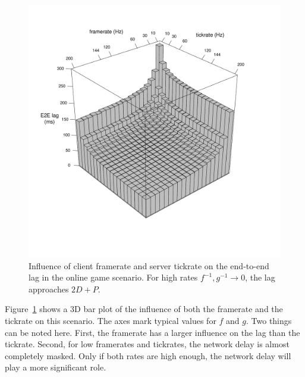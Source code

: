 \begin{figure}[!t]
	\centering
	\vspace{-6mm}
	\includegraphics[width=1.0\columnwidth]{../simulation/visualization/e2e-lag-3dbars.pdf}
	\vspace{-15mm}
	\caption{Influence of client framerate and server tickrate on the end-to-end lag in the online game scenario. For high rates $f^{-1},g^{-1}\rightarrow0$, the lag approaches $2D+P$.}
\label{fig:3dbars-framerate-tickrate-lag}
\end{figure}

Figure~\ref{fig:3dbars-framerate-tickrate-lag} shows a 3D bar plot 
of the influence of both the framerate and the tickrate on this 
scenario. The axes mark typical values for $f$ and $g$. Two things 
can be noted here. First, the framerate has a larger influence on 
the lag than the tickrate. Second, for low framerates and tickrates, 
the network delay is almost completely masked. Only if both rates 
are high enough, the network delay will play a more significant role.

